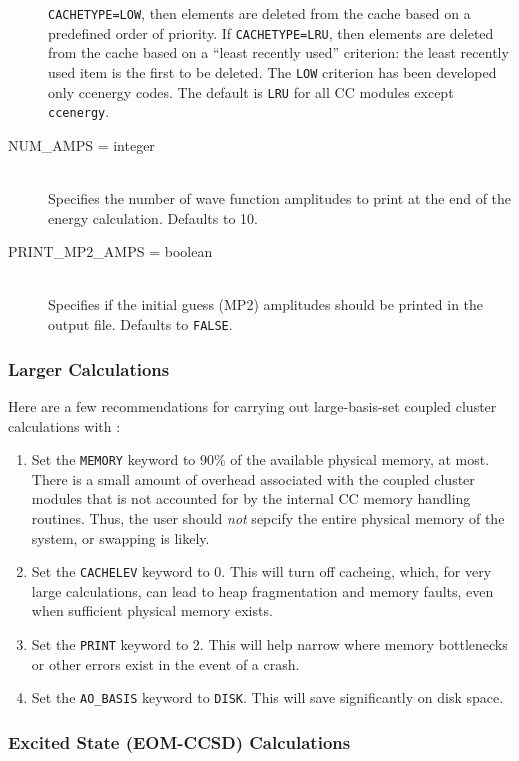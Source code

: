 \begin{description}
{\tt CACHETYPE=LOW}, then elements are deleted from the cache based on a
predefined order of priority.  If {\tt CACHETYPE=LRU}, then elements are
deleted from the cache based on a ``least recently used'' criterion: the
least recently used item is the first to be deleted.  The {\tt LOW}
criterion has been developed only ccenergy codes.  The default is {\tt LRU}
for all CC modules except {\tt ccenergy}.
\item[NUM\_AMPS = integer]\mbox{}\\
Specifies the number of wave function amplitudes to print at the end of the
energy calculation.  Defaults to 10.
\item[PRINT\_MP2\_AMPS = boolean]\mbox{}\\
Specifies if the initial guess (MP2) amplitudes should be printed in the
output file.  Defaults to {\tt FALSE}.
\end{description}

\subsubsection{Larger Calculations}

Here are a few recommendations for carrying out large-basis-set coupled cluster calculations with \PSIthree: 
\begin{enumerate}
\item Set the {\tt MEMORY} keyword to 90\% of the available physical
memory, at most.  There is a small amount of overhead associated with the
coupled cluster modules that is not accounted for by the internal CC memory
handling routines.  Thus, the user should {\em not} sepcify the entire
physical memory of the system, or swapping is likely.
\item Set the {\tt CACHELEV} keyword to 0.  This will turn off cacheing,
which, for very large calculations, can lead to heap fragmentation and
memory faults, even when sufficient physical memory exists.
\item Set the {\tt PRINT} keyword to 2.  This will help narrow where
memory bottlenecks or other errors exist in the event of a crash.
\item Set the {\tt AO\_BASIS} keyword to {\tt DISK}.  This will save
significantly on disk space.
\end{enumerate}

\subsubsection{Excited State (EOM-CCSD) Calculations}

